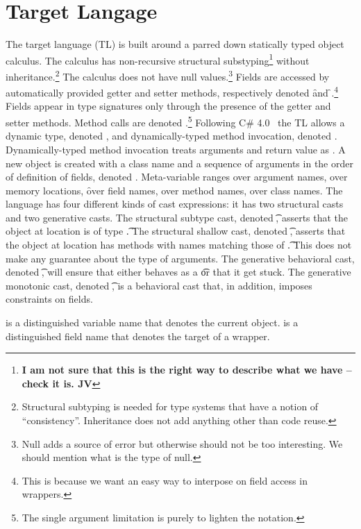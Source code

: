 \documentclass[a4paper,UKenglish,final]{lipics}
\begin{document}
\section*{Target Langage}

The target language (TL) is built around a parred down statically typed
object calculus. The calculus has non-recursive structural
substyping\footnote{\bf I am not sure that this is the right way to describe
  what we have -- check it is. JV} without inheritance.\footnote{Structural
  subtyping is needed for type systems that have a notion of
  ``consistency''. Inheritance does not add anything other than code reuse.}
The calculus does not have null values.\footnote{Null adds a source of error
  but otherwise should not be too interesting. We should mention what is the
  type of null.} Fields are accessed by automatically provided getter and
setter methods, respectively denoted \Get\x\f and \Set\x\f\e.\footnote{This
  is because we want an easy way to interpose on field access in wrappers.}
Fields appear in type signatures only through the presence of the getter and
setter methods. Method calls are denoted \Call\x\m\e.\footnote{The single
  argument limitation is purely to lighten the notation.} Following C\#
4.0~\cite{} the TL allows a dynamic type, denoted \any, and
dynamically-typed method invocation, denoted
\DynCall\x\m\e. Dynamically-typed method invocation treats arguments and
return value as \any. A new object is created with a class name and a
sequence of arguments in the order of definition of fields, denoted
\New\C{\b\e}.  Meta-variable \x ranges over argument names, \a over memory
locations, \f over field names, \m over method names, \C over class
names. The language has four different kinds of cast expressions: it has two
structural casts and two generative casts. The structural subtype cast,
denoted \SubCast\t\a, asserts that the object at location \a is of type
\t.  The structural shallow cast, denoted \ShaCast\t\a, asserts that the
object at location \a has methods with names matching those of \t. This does
not make any guarantee about the type of arguments.  The generative
behavioral cast, denoted \BehCast\t\a, will ensure that either \a behaves
as a \t or that it get stuck. The generative monotonic cast, denoted
\MonCast\t\a, is a behavioral cast that, in addition, imposes constraints
on fields.

\this is a distinguished variable name that denotes the current object.
\that is a distinguished field name that denotes the target of a wrapper.
\end{document}

